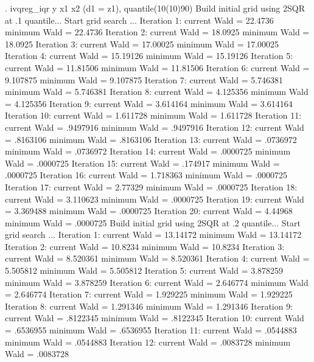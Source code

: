 . ivqreg_iqr y x1 x2 (d1 = z1), quantile(10(10)90)
{\smallskip}
Build initial grid using 2SQR at .1 quantile...
{\smallskip}
Start grid search ...
Iteration     1:  current Wald =   22.4736         minimum Wald =   22.4736
Iteration     2:  current Wald =   18.0925         minimum Wald =   18.0925
Iteration     3:  current Wald =  17.00025         minimum Wald =  17.00025
Iteration     4:  current Wald =  15.19126         minimum Wald =  15.19126
Iteration     5:  current Wald =  11.81506         minimum Wald =  11.81506
Iteration     6:  current Wald =  9.107875         minimum Wald =  9.107875
Iteration     7:  current Wald =  5.746381         minimum Wald =  5.746381
Iteration     8:  current Wald =  4.125356         minimum Wald =  4.125356
Iteration     9:  current Wald =  3.614164         minimum Wald =  3.614164
Iteration    10:  current Wald =  1.611728         minimum Wald =  1.611728
Iteration    11:  current Wald =  .9497916         minimum Wald =  .9497916
Iteration    12:  current Wald =  .8163106         minimum Wald =  .8163106
Iteration    13:  current Wald =  .0736972         minimum Wald =  .0736972
Iteration    14:  current Wald =  .0000725         minimum Wald =  .0000725
Iteration    15:  current Wald =   .174917         minimum Wald =  .0000725
Iteration    16:  current Wald =  1.718363         minimum Wald =  .0000725
Iteration    17:  current Wald =   2.77329         minimum Wald =  .0000725
Iteration    18:  current Wald =  3.110623         minimum Wald =  .0000725
Iteration    19:  current Wald =  3.369488         minimum Wald =  .0000725
Iteration    20:  current Wald =   4.44968         minimum Wald =  .0000725
{\smallskip}
Build initial grid using 2SQR at .2 quantile...
{\smallskip}
Start grid search ...
Iteration     1:  current Wald =  13.14172         minimum Wald =  13.14172
Iteration     2:  current Wald =   10.8234         minimum Wald =   10.8234
Iteration     3:  current Wald =  8.520361         minimum Wald =  8.520361
Iteration     4:  current Wald =  5.505812         minimum Wald =  5.505812
Iteration     5:  current Wald =  3.878259         minimum Wald =  3.878259
Iteration     6:  current Wald =  2.646774         minimum Wald =  2.646774
Iteration     7:  current Wald =  1.929225         minimum Wald =  1.929225
Iteration     8:  current Wald =  1.291346         minimum Wald =  1.291346
Iteration     9:  current Wald =  .8122345         minimum Wald =  .8122345
Iteration    10:  current Wald =  .6536955         minimum Wald =  .6536955
Iteration    11:  current Wald =  .0544883         minimum Wald =  .0544883
Iteration    12:  current Wald =  .0083728         minimum Wald =  .0083728
